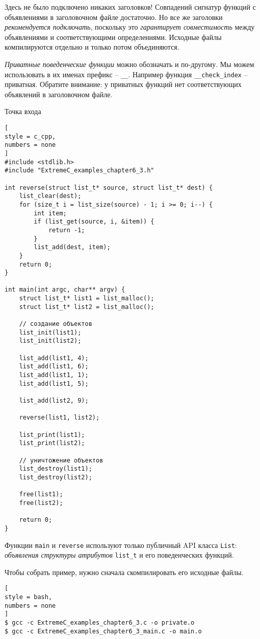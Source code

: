 \documentclass[%
	11pt,
	a4paper,
	utf8,
		]{article}
\begin{document}
Здесь не было подключено никаких заголовков! Совпадений сигнатур функций с объявлениями в заголовочном файле достаточно. Но все же заголовки \emph{рекомендуется подключать}, поскольку это \emph{гарантирует совместимость} между объявлениями и соответствующими определениями. Исходные файлы компилируются отдельно и только потом объединяются.

\emph{Приватные поведенческие функции} можно обозначать и по-другому. Мы можем использовать в их именах префикс -- \verb|__|. Например функция \verb|__check_index| -- приватная. Обратите внимание: у приватных функций нет соответствующих объявлений в заголовочном файле.

Точка входа
\begin{lstlisting}[
style = c_cpp,
numbers = none
]
#include <stdlib.h>
#include "ExtremeC_examples_chapter6_3.h"

int reverse(struct list_t* source, struct list_t* dest) {
    list_clear(dest);
    for (size_t i = list_size(source) - 1; i >= 0; i--) {
        int item;
        if (list_get(source, i, &item)) {
            return -1;
        }
        list_add(dest, item);
    }
    return 0;
}

int main(int argc, char** argv) {
    struct list_t* list1 = list_malloc();
    struct list_t* list2 = list_malloc();
    
    // создание объектов
    list_init(list1);
    list_init(list2);
    
    list_add(list1, 4);
    list_add(list1, 6);
    list_add(list1, 1);
    list_add(list1, 5);
    
    list_add(list2, 9);
    
    reverse(list1, list2);
    
    list_print(list1);
    list_print(list2);
    
    // уничтожение объектов
    list_destroy(list1);
    list_destroy(list2);
    
    free(list1);
    free(list2);
    
    return 0;
}
\end{lstlisting}

Функции \verb|main| и \verb|reverse| используют только публичный API класса \verb|List|: \emph{объявления структуры атрибутов} \verb|list_t| и его поведенческих функций. 

Чтобы собрать пример, нужно сначала скомпилировать его исходные файлы.
\begin{lstlisting}[
style = bash,
numbers = none
]
$ gcc -c ExtremeC_examples_chapter6_3.c -o private.o
$ gcc -c ExtremeC_examples_chapter6_3_main.c -o main.o
\end{lstlisting}
\end{document}
